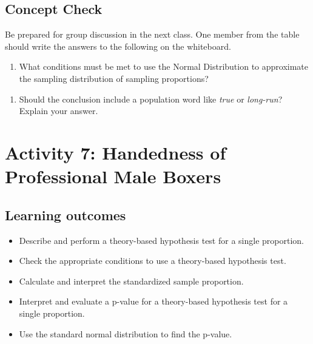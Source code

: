 \documentclass[
]{report}
\providecommand{\tightlist}{%
  \setlength{\itemsep}{0pt}\setlength{\parskip}{0pt}}
\begin{document}

\subsection{Concept Check}\label{concept-check-3}

Be prepared for group discussion in the next class. One member from the table should write the answers to the following on the whiteboard.

\begin{enumerate}
\def\labelenumi{\arabic{enumi}.}
\tightlist
\item
  What conditions must be met to use the Normal Distribution to approximate the sampling distribution of sampling proportions?
\end{enumerate}

\vspace{0.6in}

\begin{enumerate}
\def\labelenumi{\arabic{enumi}.}
\setcounter{enumi}{1}
\tightlist
\item
  Should the conclusion include a population word like \emph{true} or \emph{long-run}? Explain your answer.
\end{enumerate}

\vspace{0.6in}

\newpage

\section{Activity 7: Handedness of Professional Male Boxers}\label{activity-7-handedness-of-professional-male-boxers}


\subsection{Learning outcomes}\label{learning-outcomes-6}

\begin{itemize}
\item
  Describe and perform a theory-based hypothesis test for a single proportion.
\item
  Check the appropriate conditions to use a theory-based hypothesis test.
\item
  Calculate and interpret the standardized sample proportion.
\item
  Interpret and evaluate a p-value for a theory-based hypothesis test for a single proportion.
\item
  Use the standard normal distribution to find the p-value.
\end{itemize}
\end{document}
